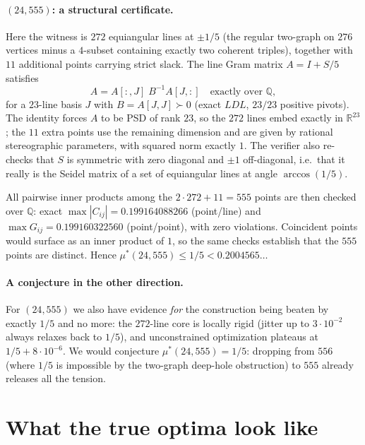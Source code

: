 \documentclass[11pt,a4paper]{article}
\newcommand{\mustar}{\mu^{*}}
\begin{document}
\paragraph{$(24,555)$: a structural certificate.}
Here the witness is $272$ equiangular lines at $\pm 1/5$ (the regular two-graph on
$276$ vertices minus a $4$-subset containing exactly two coherent triples), together
with $11$ additional points carrying strict slack. The line Gram matrix
$A = I + S/5$ satisfies
\[
A = A[:,J]\; B^{-1} A[J,:] \quad\text{exactly over } \mathbb{Q},
\]
for a $23$-line basis $J$ with $B=A[J,J]\succ 0$ (exact $LDL$, $23/23$ positive pivots).
The identity forces $A$ to be PSD of rank $23$, so the $272$ lines embed exactly in
$\mathbb{R}^{23}$; the $11$ extra points use the remaining dimension and are given by
rational stereographic parameters, with squared norm exactly $1$. The verifier also
re-checks that $S$ is symmetric with zero diagonal and $\pm1$ off-diagonal, i.e.\ that it
really is the Seidel matrix of a set of equiangular lines at angle $\arccos(1/5)$.

All pairwise inner products among the $2\cdot272+11 = 555$ points are then checked over
$\mathbb{Q}$: exact $\max|C_{ij}| = 0.199164088266$ (point/line) and
$\max G_{ij} = 0.199160322560$ (point/point), with zero violations. Coincident points
would surface as an inner product of $1$, so the same checks establish that the $555$
points are distinct. Hence $\mustar(24,555)\le 1/5 < 0.2004565\ldots$

\paragraph{A conjecture in the other direction.}
For $(24,555)$ we also have evidence \emph{for} the construction being beaten by
exactly $1/5$ and no more: the $272$-line core is locally rigid (jitter up to
$3\cdot10^{-2}$ always relaxes back to $1/5$), and unconstrained optimization
plateaus at $1/5 + 8\cdot10^{-6}$. We would conjecture $\mustar(24,555)=1/5$: dropping
from $556$ (where $1/5$ is impossible by the two-graph deep-hole obstruction) to $555$
already releases all the tension.

\section{What the true optima look like}
\end{document}
